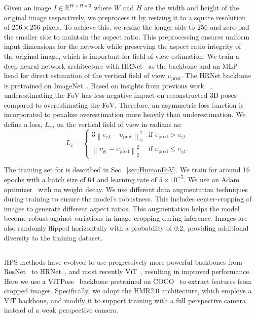 Given an image $I \in \mathbb{R}^{W\times H\times3}$ where $W$ and $H$ are the width and height of the original image respectively, we preprocess it by resizing it to a square resolution of $256 \times 256$ pixels. To achieve this, we resize the longer side to 256 and zero-pad  the smaller side to maintain the aspect ratio. This preprocessing ensures uniform input dimensions for the network while preserving the aspect ratio integrity of the original image, which is important for field of view estimation. 
We train a deep neural network architecture with HRNet~\cite{hrnet} as the backbone and an MLP head for direct estimation of the vertical field of view $\upsilon_{\text{pred}}$. The HRNet backbone is pretrained on ImageNet~\cite{imagenet}.  Based on insights from previous work ~\cite{spec,beyondwp}, underestimating the FoV has less negative impact on reconstructed 3D poses compared to overestimating the FoV. Therefore, an asymmetric loss function is incorporated to penalize overestimation more heavily than underestimation. We define a loss, $L_{\upsilon}$, on the vertical field of view in radians as:
\begin{equation}
L_{\upsilon} = 
\begin{cases} 
    3 \left\lVert \upsilon_{\text{gt}} - \upsilon_{\text{pred}} \right\rVert_{2}^{2} & \text{if } \upsilon_{\text{pred}} > \upsilon_{\text{gt}} \\
    \left\lVert \upsilon_{\text{gt}} - \upsilon_{\text{pred}} \right\rVert_{2}^{2} & \text{if } \upsilon_{\text{pred}} \leq \upsilon_{\text{gt}}.
\end{cases}
\label{eq:fov_loss}
\end{equation}

The training set for \cameramodel is described in Sec.~\ref{sec:HumanFoV}.
We train \cameramodel for around 16 epochs with a batch size of 64 and learning rate of $5 \times 10^{-5}$. We use an Adam
optimizer~\cite{adam} with no weight decay.  We use different data augmentation techniques during training to ensure the model's robustness. This includes  center-cropping of images to generate different aspect ratios. This augmentation helps the model become robust against variations in image cropping during inference. Images are also randomly flipped horizontally with a probability of 0.2, providing additional diversity to the training dataset.


\subsection{\hpsmodel}
HPS methods have evolved to use progressively more powerful backbones from ResNet~\cite{resnet} to HRNet~\cite{hrnet}, and most recently ViT~\cite{vit}, resulting in improved performance.
Here we use a ViTPose~\cite{vitpose} backbone pretrained on COCO~\cite{coco} to extract features from cropped images. Specifically, we adopt the HMR2.0 architecture, which employs a ViT backbone, and modify it to support training with a full perspective camera instead of a weak perspective camera. 

